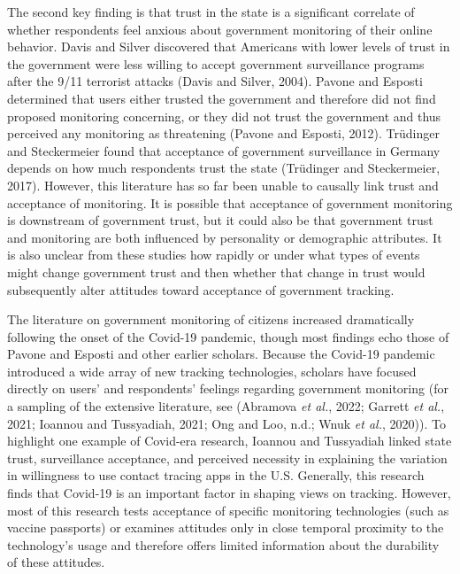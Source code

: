 \documentclass[
  letterpaper,
  DIV=11,
  numbers=noendperiod]{scrartcl}
\begin{document}
The second key finding is that trust in the state is a significant
correlate of whether respondents feel anxious about government
monitoring of their online behavior. Davis and Silver discovered that
Americans with lower levels of trust in the government were less willing
to accept government surveillance programs after the 9/11 terrorist
attacks (Davis and Silver, 2004). Pavone and Esposti determined that
users either trusted the government and therefore did not find proposed
monitoring concerning, or they did not trust the government and thus
perceived any monitoring as threatening (Pavone and Esposti, 2012).
Trüdinger and Steckermeier found that acceptance of government
surveillance in Germany depends on how much respondents trust the state
(Trüdinger and Steckermeier, 2017). However, this literature has so far
been unable to causally link trust and acceptance of monitoring. It is
possible that acceptance of government monitoring is downstream of
government trust, but it could also be that government trust and
monitoring are both influenced by personality or demographic attributes.
It is also unclear from these studies how rapidly or under what types of
events might change government trust and then whether that change in
trust would subsequently alter attitudes toward acceptance of government
tracking.

The literature on government monitoring of citizens increased
dramatically following the onset of the Covid-19 pandemic, though most
findings echo those of Pavone and Esposti and other earlier scholars.
Because the Covid-19 pandemic introduced a wide array of new tracking
technologies, scholars have focused directly on users' and respondents'
feelings regarding government monitoring (for a sampling of the
extensive literature, see (Abramova \emph{et al.}, 2022; Garrett
\emph{et al.}, 2021; Ioannou and Tussyadiah, 2021; Ong and Loo, n.d.;
Wnuk \emph{et al.}, 2020)). To highlight one example of Covid-era
research, Ioannou and Tussyadiah linked state trust, surveillance
acceptance, and perceived necessity in explaining the variation in
willingness to use contact tracing apps in the U.S. Generally, this
research finds that Covid-19 is an important factor in shaping views on
tracking. However, most of this research tests acceptance of specific
monitoring technologies (such as vaccine passports) or examines
attitudes only in close temporal proximity to the technology's usage and
therefore offers limited information about the durability of these
attitudes.
\end{document}
